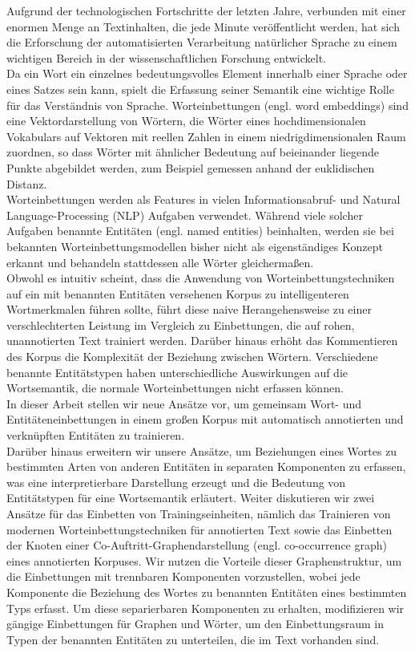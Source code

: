 \noindent
Aufgrund der technologischen Fortschritte der letzten Jahre, verbunden mit einer enormen Menge an Textinhalten, die jede Minute veröffentlicht werden, hat sich die  Erforschung der automatisierten Verarbeitung natürlicher Sprache zu einem wichtigen Bereich in der wissenschaftlichen Forschung entwickelt.\\
Da ein Wort ein einzelnes bedeutungsvolles Element innerhalb einer Sprache oder eines Satzes sein kann, spielt die Erfassung seiner Semantik eine wichtige Rolle für das Verständnis  von Sprache.
Worteinbettungen (engl. word embeddings) sind eine Vektordarstellung von Wörtern, die Wörter eines hochdimensionalen Vokabulars auf Vektoren mit reellen Zahlen in einem niedrigdimensionalen Raum zuordnen, so dass Wörter mit ähnlicher Bedeutung auf beieinander liegende Punkte abgebildet werden, zum Beispiel gemessen anhand der euklidischen Distanz.\\
Worteinbettungen werden als Features in vielen Informationsabruf- und Natural Language-Processing (NLP) Aufgaben verwendet. Während viele solcher Aufgaben benannte Entitäten (engl. named entities) beinhalten, werden sie bei bekannten Worteinbettungsmodellen bisher nicht als eigenständiges Konzept erkannt und behandeln stattdessen alle Wörter gleichermaßen.\\
Obwohl es intuitiv scheint, dass die Anwendung von Worteinbettungstechniken auf ein mit benannten Entitäten versehenen Korpus zu intelligenteren Wortmerkmalen führen sollte, führt diese naive Herangehensweise zu einer verschlechterten Leistung im Vergleich zu Einbettungen, die auf rohen, unannotierten Text trainiert werden.
Darüber hinaus erhöht das Kommentieren des Korpus die Komplexität der Beziehung zwischen Wörtern. Verschiedene benannte Entitätstypen haben unterschiedliche Auswirkungen auf die Wortsemantik, die normale Worteinbettungen nicht erfassen können.\\
In dieser Arbeit stellen wir neue Ansätze vor, um gemeinsam Wort- und Entitäteneinbettungen in einem großen Korpus mit automatisch annotierten und verknüpften Entitäten zu trainieren.\\
Darüber hinaus erweitern wir unsere Ansätze, um Beziehungen eines Wortes zu bestimmten Arten von anderen Entitäten in separaten Komponenten zu erfassen, was eine interpretierbare Darstellung erzeugt und die Bedeutung von Entitätstypen für eine Wortsemantik erläutert.
Weiter diskutieren wir zwei Ansätze für das Einbetten von Trainingseinheiten, nämlich das Trainieren von modernen Worteinbettungstechniken für annotierten Text sowie das Einbetten der Knoten einer Co-Auftritt-Graphendarstellung (engl. co-occurrence graph) eines annotierten Korpuses. Wir nutzen die Vorteile dieser Graphenstruktur, um die Einbettungen mit trennbaren Komponenten vorzustellen, wobei jede Komponente die Beziehung des Wortes zu benannten Entitäten eines bestimmten Typs erfasst. Um diese separierbaren Komponenten zu erhalten, modifizieren wir gängige Einbettungen für Graphen und Wörter, um den Einbettungsraum in Typen der benannten Entitäten zu unterteilen, die im Text vorhanden sind.
